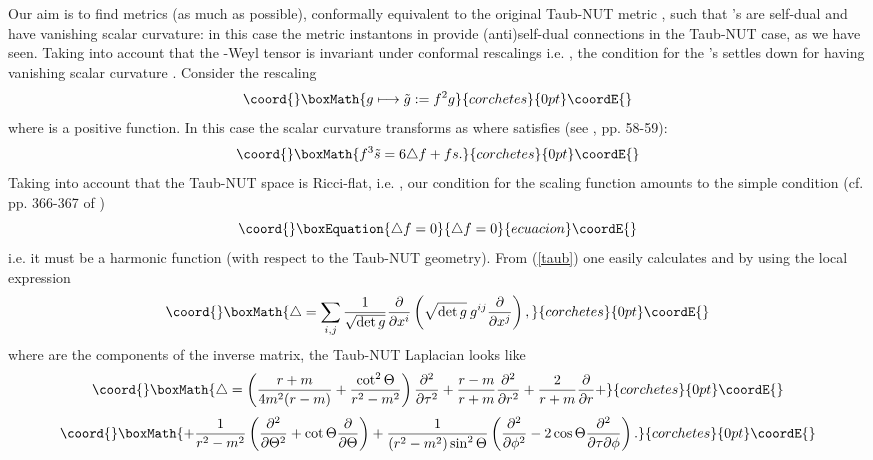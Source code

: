 \documentclass[a4paper,12pt,draft]{article}
\begin{document}
Our aim is to find metrics \coordHE{} (as much as
possible), conformally equivalent to the original Taub-NUT metric \coordHE{},
such that \coordHE{}'s are self-dual and have vanishing scalar curvature: 
in this case the metric instantons in \coordHE{} provide (anti)self-dual
connections in the Taub-NUT case, as we have seen. Taking
into account that the \coordHE{}-Weyl tensor \coordHE{} is invariant under
conformal rescalings i.e. \coordHE{}, the condition
\coordHE{} for the \coordHE{}'s settles down for
having vanishing scalar curvature \coordHE{}. Consider the rescaling
\[\coord{}\boxMath{g\longmapsto\tilde{g}:=f^2g}{corchetes}{0pt}\coordE{}\]
where \coordHE{} is a positive function. In this case
the scalar curvature transforms as \coordHE{} where \coordHE{}
satisfies (see \cite{bes}, pp. 58-59):
\[\coord{}\boxMath{f^3\tilde{s}=6\triangle f +fs.}{corchetes}{0pt}\coordE{}\]
Taking into account that the Taub-NUT space is Ricci-flat, i.e. \coordHE{}, our
condition for the scaling function amounts to the simple condition
(cf. pp. 366-367 of \cite{boo-ble})
\begin{equation}\coord{}\boxEquation{
\triangle f =0
\label{laplace}
}{
\triangle f =0
}{ecuacion}\coordE{}\end{equation}
i.e. it must be a harmonic function (with respect to the Taub-NUT
geometry). From (\ref{taub}) one easily calculates \coordHE{} and by using the local expression
\[\coord{}\boxMath{\triangle =\sum\limits_{i,j}{1\over\sqrt{\det g}}{\partial\over\partial
x^i}\left(\sqrt{\det g}\:g^{ij}{\partial\over\partial x^j}\right) ,}{corchetes}{0pt}\coordE{}\]
where \coordHE{} are the components of the inverse matrix, the Taub-NUT
Laplacian looks like
\[\coord{}\boxMath{\triangle
=\left( {r+m\over 4m^2(r-m)}+{\cot^2\Theta\over r^2-m^2}\right)
{\partial^2\over\partial\tau^2}+{r-m\over
r+m}{\partial^2\over\partial r^2}+{2\over r+m}{\partial\over\partial
r}+}{corchetes}{0pt}\coordE{}\]
\[\coord{}\boxMath{+{1\over
r^2-m^2}\left({\partial^2\over\partial\Theta^2}+\cot\Theta{\partial\over
\partial\Theta}\right) +{1\over 
(r^2-m^2)\sin^2\Theta}\left({\partial^2\over\partial\phi^2}-2\cos\Theta
{\partial^2\over\partial\tau\partial\phi}\right) .}{corchetes}{0pt}\coordE{}\]
\end{document}
